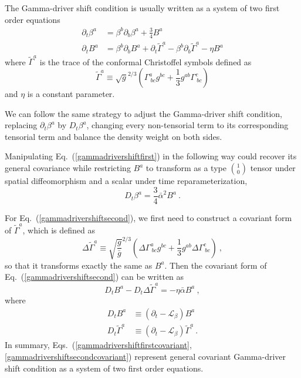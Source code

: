The Gamma-driver shift condition is usually written as a system of two first order equations
\begin{subequations}\label{gammadrivershiftset}
\begin{align}
\partial_{t}\beta^{a} & = \beta^{b}\partial_{b}\beta^{a} + \frac{3}{4}B^{a}\label{gammadrivershiftfirst}\\
\partial_{t}B^{a} & = \beta^{b}\partial_{b}B^{a} + \partial_{t}{\tilde \Gamma}^{a} - \beta^{b}\partial_{b}{\tilde \Gamma}^{a} - \eta B^{a}\label{gammadrivershiftsecond}
\end{align}
\end{subequations}
where ${\tilde \Gamma}^{a}$ is the trace of the conformal Christoffel symbols defined as
\begin{equation}
{\tilde \Gamma}^{a} \equiv \sqrt{g}^{2/3}\left(\Gamma^{a}_{~bc}g^{bc} + \frac{1}{3}g^{ab}\Gamma^{c}_{~bc}\right)
\end{equation}
and $\eta$ is a constant parameter. 

We can follow the same strategy to adjust the Gamma-driver shift condition, replacing $\partial_{t}\beta^{a}$ by $D_{t}\beta^{a}$, changing every non-tensorial term to its corresponding tensorial term and balance the density weight on both sides. 

Manipulating Eq.~(\ref{gammadrivershiftfirst}) in the following way could recover its general covariance while restricting $B^{a}$ to transform as a type $1 \choose 0$ tensor under spatial diffeomorphism and a scalar under time reparameterization, 
\begin{equation}\label{gammadrivershiftfirstcovariant}
	D_{t}\beta^{a} = \frac{3}{4}{\bar \alpha}^{2}B^{a} \ .
\end{equation}

For Eq.~(\ref{gammadrivershiftsecond}), we first need to construct a covariant form of ${\tilde \Gamma}^{a}$, which is defined as
\begin{equation}
\Delta {\tilde \Gamma}^{a} \equiv \sqrt{\frac{g}{{\bar g}}}^{2/3}\left(\Delta \Gamma^{a}_{~bc}g^{bc} + \frac{1}{3}g^{ab}\Delta \Gamma^{c}_{~bc}\right) \ ,
\end{equation}
so that it transforms exactly the same as $B^{a}$. Then the covariant form of Eq.~(\ref{gammadrivershiftsecond}) can be written as
\begin{equation}\label{gammadrivershiftsecondcovariant}
	D_{t}B^{a} - D_{t}\Delta {\tilde \Gamma}^{a}  = - \eta {\bar \alpha}B^{a} \ , 
\end{equation}
where
\begin{subequations}
\begin{align}
D_{t}B^{a} & \equiv \left(\partial_{t} - \mathcal{L}_{\beta}\right)B^{a}\\
D_{t}{\tilde \Gamma}^{a} & \equiv \left(\partial_{t} - \mathcal{L}_{\beta}\right){\tilde \Gamma}^{a} \ .
\end{align}
\end{subequations}
In summary, Eqs.~(\ref{gammadrivershiftfirstcovariant}, \ref{gammadrivershiftsecondcovariant}) represent general covariant Gamma-driver shift condition as a system of two first order equations. 

